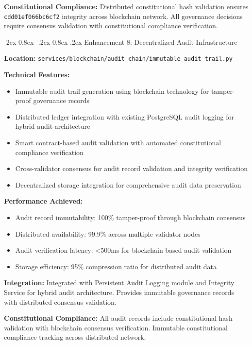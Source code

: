 \documentclass[manuscript,screen,9pt]{acmart}
\makeatletter
\renewcommand\subsubsection{\@startsection{subsubsection}{3}{\z@}%
  {-2ex\@plus -0.8ex \@minus -.2ex}%
  {0.8ex \@plus .2ex}%
  {\normalfont\normalsize\bfseries}}
\makeatother
\begin{document}
\textbf{Constitutional Compliance:} Distributed constitutional hash validation ensures \texttt{\small{cdd01ef066bc6cf2}} integrity across blockchain network. All governance decisions require consensus validation with constitutional compliance verification.

\subsubsection{Enhancement 8: Decentralized Audit Infrastructure}
\label{subsubsec:decentralized_audit}

\textbf{Location:} \texttt{services/blockchain/audit\_chain/immutable\_audit\_trail.py}

\textbf{Technical Features:}
\begin{itemize}[itemsep=1pt,parsep=1pt]
    \item Immutable audit trail generation using blockchain technology for tamper-proof governance records
    \item Distributed ledger integration with existing PostgreSQL audit logging for hybrid audit architecture
    \item Smart contract-based audit validation with automated constitutional compliance verification
    \item Cross-validator consensus for audit record validation and integrity verification
    \item Decentralized storage integration for comprehensive audit data preservation
\end{itemize}

\textbf{Performance Achieved:}
\begin{itemize}[itemsep=1pt,parsep=1pt]
    \item Audit record immutability: 100\% tamper-proof through blockchain consensus
    \item Distributed availability: 99.9\% across multiple validator nodes
    \item Audit verification latency: <500ms for blockchain-based audit validation
    \item Storage efficiency: 95\% compression ratio for distributed audit data
\end{itemize}

\textbf{Integration:} Integrated with Persistent Audit Logging module and Integrity Service for hybrid audit architecture. Provides immutable governance records with distributed consensus validation.

\textbf{Constitutional Compliance:} All audit records include constitutional hash validation with blockchain consensus verification. Immutable constitutional compliance tracking across distributed network.
\end{document}
